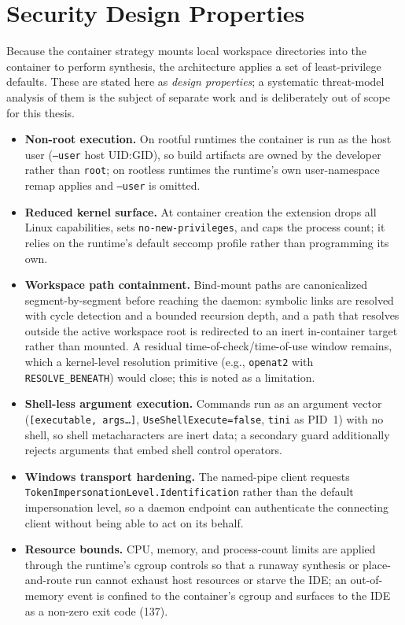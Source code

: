 \section{Security Design Properties}
\label{sec:security_design}
Because the container strategy mounts local workspace directories into the container to perform synthesis, the architecture applies a set of least-privilege defaults. These are stated here as \emph{design properties}; a systematic threat-model analysis of them is the subject of separate work and is deliberately out of scope for this thesis.

\begin{itemize}
    \item \textbf{Non-root execution.} On rootful runtimes the container is run as the host user (\texttt{--user} host UID:GID), so build artifacts are owned by the developer rather than \texttt{root}; on rootless runtimes the runtime's own user-namespace remap applies and \texttt{--user} is omitted.
    \item \textbf{Reduced kernel surface.} At container creation the extension drops all Linux capabilities, sets \texttt{no-new-privileges}, and caps the process count; it relies on the runtime's default seccomp profile rather than programming its own.
    \item \textbf{Workspace path containment.} Bind-mount paths are canonicalized segment-by-segment before reaching the daemon: symbolic links are resolved with cycle detection and a bounded recursion depth, and a path that resolves outside the active workspace root is redirected to an inert in-container target rather than mounted. A residual time-of-check/time-of-use window remains, which a kernel-level resolution primitive (e.g., \texttt{openat2} with \texttt{RESOLVE\_BENEATH}) would close; this is noted as a limitation.
    \item \textbf{Shell-less argument execution.} Commands run as an argument vector (\texttt{[executable, args\ldots]}, \texttt{UseShellExecute=false}, \texttt{tini} as PID~1) with no shell, so shell metacharacters are inert data; a secondary guard additionally rejects arguments that embed shell control operators.
    \item \textbf{Windows transport hardening.} The named-pipe client requests \texttt{TokenImpersonationLevel.Identification} rather than the default impersonation level, so a daemon endpoint can authenticate the connecting client without being able to act on its behalf.
    \item \textbf{Resource bounds.} CPU, memory, and process-count limits are applied through the runtime's cgroup controls so that a runaway synthesis or place-and-route run cannot exhaust host resources or starve the IDE; an out-of-memory event is confined to the container's cgroup and surfaces to the IDE as a non-zero exit code (\num{137}).
\end{itemize}
